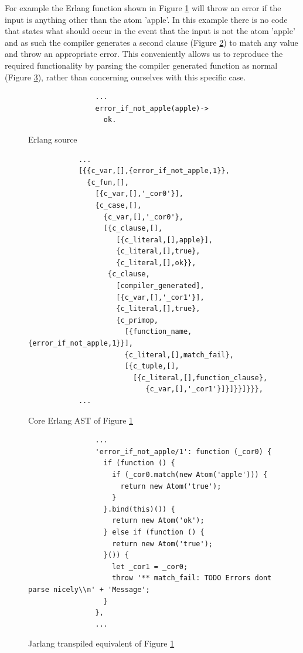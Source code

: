 \documentclass[twoside,12pt,titlepage,a4paper]{article}
\begin{document}
For example the Erlang function shown in Figure \ref{fig:code_comparison:erl} will throw an error if the input is anything other than the atom 'apple'. In this example there is no code that states what should occur in the event that the input is not the atom 'apple' and as such the compiler generates a second clause (Figure \ref{fig:code_comparison:erl_ast}) to match any value and throw an appropriate error. This conveniently allows us to reproduce the required functionality by parsing the compiler generated function as normal (Figure \ref{fig:code_comparison:js}), rather than concerning ourselves with this specific case.
		 \begin{figure}[t]
		 	\centering
		 		\begin{verbatim}
		 		...
		 		error_if_not_apple(apple)->
		 		  ok.
		 		\end{verbatim}
		 	\caption{Erlang source}
		 	\label{fig:code_comparison:erl}
		 \end{figure}
		 \begin{figure}[t]
		 	\centering
		 	\begin{verbatim}
		 	...
		 	[{{c_var,[],{error_if_not_apple,1}},
		 	  {c_fun,[],
		 	    [{c_var,[],'_cor0'}],
		 	    {c_case,[],
		 	      {c_var,[],'_cor0'},
		 	      [{c_clause,[],
		 	         [{c_literal,[],apple}],
		 	         {c_literal,[],true},
		 	         {c_literal,[],ok}},
		 	       {c_clause,
		 	         [compiler_generated],
		 	         [{c_var,[],'_cor1'}],
		 	         {c_literal,[],true},
		 	         {c_primop,
		 	           [{function_name,{error_if_not_apple,1}}],
		 	           {c_literal,[],match_fail},
		 	           [{c_tuple,[],
		 	             [{c_literal,[],function_clause},
		 	                {c_var,[],'_cor1'}]}]}}]}}},
		 	...
		 	\end{verbatim}
		 	\caption{Core Erlang AST of Figure \ref{fig:code_comparison:erl}}
		 	\label{fig:code_comparison:erl_ast}
		 \end{figure}
		 \begin{figure}[t]
		 	\centering
		 		\begin{verbatim}
		 		...
		 		'error_if_not_apple/1': function (_cor0) {
		 		  if (function () {
		 		    if (_cor0.match(new Atom('apple'))) {
		 		      return new Atom('true');
		 		    }
		 		  }.bind(this)()) {
		 		    return new Atom('ok');
		 		  } else if (function () {
		 		    return new Atom('true');
		 		  }()) {
		 		    let _cor1 = _cor0;
		 		    throw '** match_fail: TODO Errors dont parse nicely\\n' + 'Message';
		 		  }
		 		},
		 		...
		 		\end{verbatim}
		 	\caption{Jarlang transpiled equivalent of Figure \ref{fig:code_comparison:erl}}
		 	\label{fig:code_comparison:js}
		 \end{figure}
\end{document}
